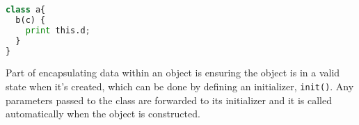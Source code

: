 \begin{lstlisting}[language=python]
class a{
  b(c) {
    print this.d;
  }
}
\end{lstlisting}

Part of encapsulating data within an object is ensuring the object is in a valid state when it’s created, which can be done by defining an initializer, \verb+init()+. Any parameters passed to the class are forwarded to its initializer and it is called automatically when the object is constructed.




